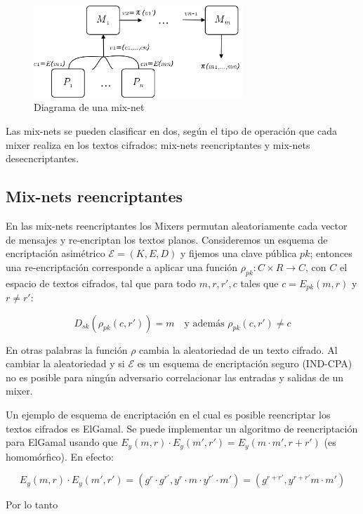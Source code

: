 \begin{figure}[hp]
    \centering
    \includegraphics[width=0.7\textwidth]{figs/mixnet}
    \caption{Diagrama de una mix-net}
    \label{fig:mix-net}
\end{figure}


Las mix-nets se pueden clasificar en dos, según el tipo de operación que cada mixer realiza en los textos
cifrados: mix-nets reencriptantes y mix-nets desecncriptantes.

\subsection{Mix-nets reencriptantes}

En las mix-nets reencriptantes los Mixers permutan
aleatoriamente cada vector de mensajes y re-encriptan los textos planos.
Consideremos un esquema de encriptación asimétrico $\mathcal{E} = (K, E, D)$ y fijemos
una clave pública $pk$; entonces
una re-encriptación
corresponde a aplicar una función $\rho_{pk}:C\times R\to C$, con $C$ el
espacio de textos cifrados, tal que para todo $m, r, r', c$ tales que $c =  E_{pk}(m, r)$ y
$r \neq r'$:

$$D_{sk}(\rho_{pk}(c, r')) = m \quad \textrm{y además } \rho_{pk}(c, r') \neq c$$

En otras palabras la función $\rho$ cambia la aleatoriedad de un texto
cifrado.
Al cambiar la aleatoriedad y si  $\mathcal{E}$ es un esquema de encriptación seguro (IND-CPA)
no es posible para ningún adversario correlacionar las entradas y salidas de un mixer.

Un ejemplo de esquema de encriptación en el cual es posible reencriptar
los textos cifrados es ElGamal. Se puede implementar un algoritmo de reencriptación para
ElGamal usando que $E_{y}(m,r)\cdot E_{y}(m',r') = E_{y}(m \cdot m',r+r')$ (es homomórfico). En efecto:

$$ E_{y}(m,r) \cdot
    E_{y}(m',r')
=
(g^{r} \cdot g^{r'},
 y^{r} \cdot m \cdot y^{r'} \cdot m')
=
(g^{r+r'},
 y^{r+r'}m \cdot m') $$

Por lo tanto


